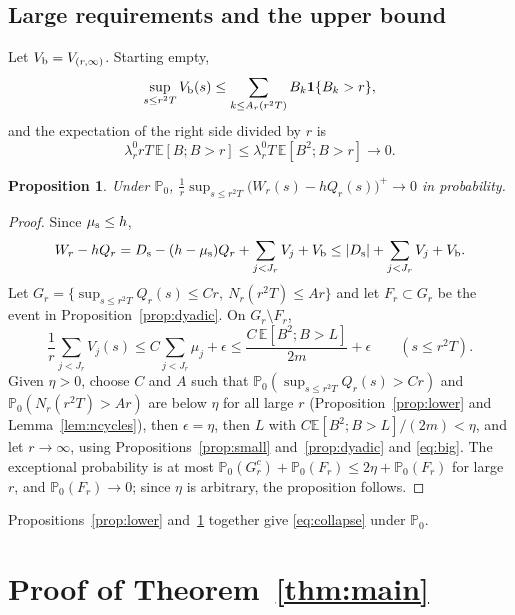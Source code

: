 \documentclass[11pt]{amsart}
\newtheorem{proposition}[theorem]{Proposition}
\theoremstyle{remark}
\numberwithin{equation}{section}
\newcommand{\E}{\mathbb E}
\newcommand{\Pp}{\mathbb P}
\newcommand{\1}{\mathbf 1}
\begin{document}
\subsection{Large requirements and the upper bound}
Let $V_{\rm b}=V_{(r,\infty)}$. Starting empty,
\[
\sup_{s\le r^2T}V_{\rm b}(s)\le\sum_{k\le A_r(r^2T)}B_k\1\{B_k>r\},
\]
and the expectation of the right side divided by $r$ is
\begin{equation}\label{eq:big}
\lambda_r^0rT\,\E[B;B>r]\le\lambda^0_rT\,\E[B^2;B>r]\to0 .
\end{equation}

\begin{proposition}\label{prop:upper}
Under $\Pp_0$, $\frac1r\sup_{s\le r^2T}\bigl(W_r(s)-hQ_r(s)\bigr)^+\to0$ in probability.
\end{proposition}

\begin{proof}
Since $\mu_{\rm s}\le h$,
\[
W_r-hQ_r=D_{\rm s}-(h-\mu_{\rm s})Q_r+\sum_{j<J_r}V_j+V_{\rm b}\le|D_{\rm s}|+\sum_{j<J_r}V_j+V_{\rm b}.
\]
Let $G_r=\{\sup_{s\le r^2T}Q_r(s)\le Cr,\ N_r(r^2T)\le Ar\}$ and let $F_r\subset G_r$ be the event in Proposition~\ref{prop:dyadic}. On $G_r\setminus F_r$,
\[
\frac1r\sum_{j<J_r}V_j(s)\le C\sum_{j<J_r}\mu_j+\epsilon\le\frac{C\,\E[B^2;B>L]}{2m}+\epsilon\qquad(s\le r^2T).
\]
Given $\eta>0$, choose $C$ and $A$ such that $\Pp_0(\sup_{s\le r^2T}Q_r(s)>Cr)$ and $\Pp_0(N_r(r^2T)>Ar)$ are below $\eta$ for all large $r$ (Proposition~\ref{prop:lower} and Lemma~\ref{lem:ncycles}), then $\epsilon=\eta$, then $L$ with $C\E[B^2;B>L]/(2m)<\eta$, and let $r\to\infty$, using Propositions~\ref{prop:small} and~\ref{prop:dyadic} and \eqref{eq:big}. The exceptional probability is at most $\Pp_0(G_r^c)+\Pp_0(F_r)\le2\eta+\Pp_0(F_r)$ for large $r$, and $\Pp_0(F_r)\to0$; since $\eta$ is arbitrary, the proposition follows.
\end{proof}

Propositions~\ref{prop:lower} and~\ref{prop:upper} together give \eqref{eq:collapse} under $\Pp_0$.

\section{Proof of Theorem~\ref{thm:main}}\label{sec:proof}
\end{document}
